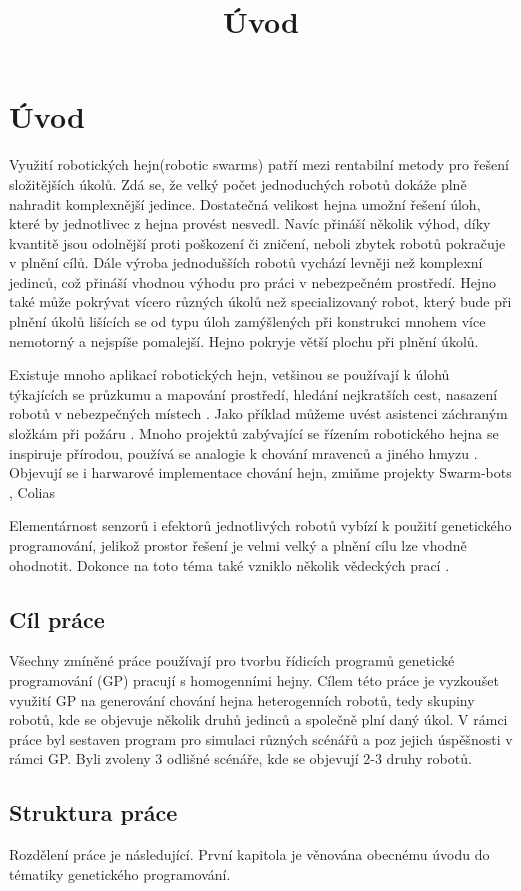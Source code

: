 \chapter*{Úvod}

\title{Úvod}
Využití robotických hejn(robotic swarms) patří mezi rentabilní metody pro řešení složitějších úkolů. Zdá se, že velký počet jednoduchých robotů dokáže plně nahradit komplexnější jedince. Dostatečná velikost hejna umožní řešení úloh, které by jednotlivec z hejna provést nesvedl. Navíc přináší několik výhod, díky kvantitě jsou odolnější proti poškození či zničení, neboli zbytek robotů pokračuje v plnění cílů. Dále výroba jednodušších robotů vychází levněji než komplexní jedinců, což přináší vhodnou výhodu pro práci v nebezpečném prostředí. Hejno také může pokrývat vícero různých úkolů než specializovaný robot, který bude při plnění úkolů lišících se od typu úloh zamýšlených při konstrukci mnohem více nemotorný a nejspíše pomalejší. Hejno pokryje větší plochu při plnění úkolů. 
\par
Existuje mnoho aplikací robotických hejn, vetšinou se používají k úlohů týkajících se průzkumu a mapování prostředí, hledání nejkratších cest, nasazení robotů v nebezpečných místech \citep{swarmApp}. Jako příklad můžeme uvést asistenci záchraným složkám při požáru \citep{fireRobots}. Mnoho projektů zabývající se řízením robotického hejna se inspiruje přírodou, používá se analogie k chování mravenců a jiného hmyzu \citep{PheroRobot}. Objevují se i harwarové implementace chování hejn, zmiňme projekty Swarm-bots \citep{swarmBots}, Colias \citep{Colias}  
\par 
Elementárnost senzorů i efektorů jednotlivých robotů vybízí k použití genetického programování, jelikož prostor řešení je velmi velký a plnění cílu lze vhodně ohodnotit. Dokonce na toto téma také vzniklo několik vědeckých prací \citep{ENovel} \citep{geneticSwarm}.
\section*{Cíl práce}
Všechny zmíněné práce používají pro tvorbu řídicích programů genetické programování (GP) pracují s homogenními hejny. Cílem této práce je vyzkoušet využití GP na generování chování hejna heterogenních robotů, tedy skupiny robotů, kde se objevuje několik druhů jedinců a společně plní daný úkol. V rámci práce byl sestaven program pro simulaci různých scénářů a poz jejich úspěšnosti v rámci GP. Byli zvoleny 3 odlišné scénáře, kde se objevují 2-3 druhy robotů.
\section*{Struktura práce}
Rozdělení práce je následující. První kapitola je věnována obecnému úvodu do tématiky genetického programování.  